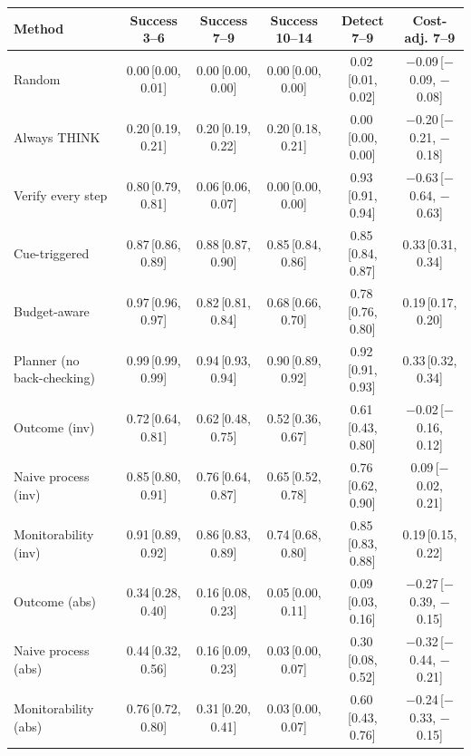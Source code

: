 \begin{tabular}{lccccc}
\toprule
Method & Success 3--6 & Success 7--9 & Success 10--14 & Detect 7--9 & Cost-adj. 7--9 \\
\midrule
Random & 0.00\,{\scriptsize[0.00, 0.01]} & 0.00\,{\scriptsize[0.00, 0.00]} & 0.00\,{\scriptsize[0.00, 0.00]} & 0.02\,{\scriptsize[0.01, 0.02]} & \ensuremath{-}0.09\,{\scriptsize[\ensuremath{-}0.09, \ensuremath{-}0.08]} \\
Always THINK & 0.20\,{\scriptsize[0.19, 0.21]} & 0.20\,{\scriptsize[0.19, 0.22]} & 0.20\,{\scriptsize[0.18, 0.21]} & 0.00\,{\scriptsize[0.00, 0.00]} & \ensuremath{-}0.20\,{\scriptsize[\ensuremath{-}0.21, \ensuremath{-}0.18]} \\
Verify every step & 0.80\,{\scriptsize[0.79, 0.81]} & 0.06\,{\scriptsize[0.06, 0.07]} & 0.00\,{\scriptsize[0.00, 0.00]} & 0.93\,{\scriptsize[0.91, 0.94]} & \ensuremath{-}0.63\,{\scriptsize[\ensuremath{-}0.64, \ensuremath{-}0.63]} \\
Cue-triggered & 0.87\,{\scriptsize[0.86, 0.89]} & 0.88\,{\scriptsize[0.87, 0.90]} & 0.85\,{\scriptsize[0.84, 0.86]} & 0.85\,{\scriptsize[0.84, 0.87]} & 0.33\,{\scriptsize[0.31, 0.34]} \\
Budget-aware & 0.97\,{\scriptsize[0.96, 0.97]} & 0.82\,{\scriptsize[0.81, 0.84]} & 0.68\,{\scriptsize[0.66, 0.70]} & 0.78\,{\scriptsize[0.76, 0.80]} & 0.19\,{\scriptsize[0.17, 0.20]} \\
Planner (no back-checking) & 0.99\,{\scriptsize[0.99, 0.99]} & 0.94\,{\scriptsize[0.93, 0.94]} & 0.90\,{\scriptsize[0.89, 0.92]} & 0.92\,{\scriptsize[0.91, 0.93]} & 0.33\,{\scriptsize[0.32, 0.34]} \\
\midrule
Outcome (inv) & 0.72\,{\scriptsize[0.64, 0.81]} & 0.62\,{\scriptsize[0.48, 0.75]} & 0.52\,{\scriptsize[0.36, 0.67]} & 0.61\,{\scriptsize[0.43, 0.80]} & \ensuremath{-}0.02\,{\scriptsize[\ensuremath{-}0.16, 0.12]} \\
Naive process (inv) & 0.85\,{\scriptsize[0.80, 0.91]} & 0.76\,{\scriptsize[0.64, 0.87]} & 0.65\,{\scriptsize[0.52, 0.78]} & 0.76\,{\scriptsize[0.62, 0.90]} & 0.09\,{\scriptsize[\ensuremath{-}0.02, 0.21]} \\
Monitorability (inv) & 0.91\,{\scriptsize[0.89, 0.92]} & 0.86\,{\scriptsize[0.83, 0.89]} & 0.74\,{\scriptsize[0.68, 0.80]} & 0.85\,{\scriptsize[0.83, 0.88]} & 0.19\,{\scriptsize[0.15, 0.22]} \\
Outcome (abs) & 0.34\,{\scriptsize[0.28, 0.40]} & 0.16\,{\scriptsize[0.08, 0.23]} & 0.05\,{\scriptsize[0.00, 0.11]} & 0.09\,{\scriptsize[0.03, 0.16]} & \ensuremath{-}0.27\,{\scriptsize[\ensuremath{-}0.39, \ensuremath{-}0.15]} \\
Naive process (abs) & 0.44\,{\scriptsize[0.32, 0.56]} & 0.16\,{\scriptsize[0.09, 0.23]} & 0.03\,{\scriptsize[0.00, 0.07]} & 0.30\,{\scriptsize[0.08, 0.52]} & \ensuremath{-}0.32\,{\scriptsize[\ensuremath{-}0.44, \ensuremath{-}0.21]} \\
Monitorability (abs) & 0.76\,{\scriptsize[0.72, 0.80]} & 0.31\,{\scriptsize[0.20, 0.41]} & 0.03\,{\scriptsize[0.00, 0.07]} & 0.60\,{\scriptsize[0.43, 0.76]} & \ensuremath{-}0.24\,{\scriptsize[\ensuremath{-}0.33, \ensuremath{-}0.15]} \\
\bottomrule
\end{tabular}
